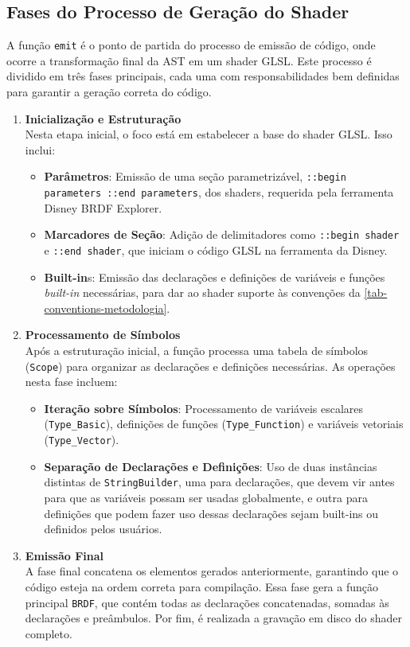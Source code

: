\subsection{Fases do Processo de Geração do Shader}
\label{sub-start-emitting}

A função \verb"emit" é o ponto de partida do processo de emissão de código, onde ocorre a transformação final da AST em um shader GLSL. Este processo é dividido em três fases principais, cada uma com responsabilidades bem definidas para garantir a geração correta do código.

\begin{enumerate}
    \item \textbf{Inicialização e Estruturação} \\
    Nesta etapa inicial, o foco está em estabelecer a base do shader GLSL. Isso inclui:
    \begin{itemize}
        \item \textbf{Parâmetros}: Emissão de uma seção parametrizável, \verb"::begin parameters ::end parameters", dos shaders, requerida pela ferramenta Disney BRDF Explorer.
        \item \textbf{Marcadores de Seção}: Adição de delimitadores como \verb|::begin shader| e \verb|::end shader|, que iniciam o código GLSL na ferramenta da Disney.
        \item \textbf{Built-in}s: Emissão das declarações e definições de variáveis e funções \textit{built-in} necessárias, para dar ao shader suporte às convenções da \autoref{tab-conventions-metodologia}.
    \end{itemize}

    \item \textbf{Processamento de Símbolos} \\
    Após a estruturação inicial, a função processa uma tabela de símbolos (\verb|Scope|) para organizar as declarações e definições necessárias. As operações nesta fase incluem:
    \begin{itemize}
        \item \textbf{Iteração sobre Símbolos}: Processamento de variáveis escalares (\verb|Type_Basic|), definições de funções (\verb|Type_Function|) e variáveis vetoriais (\verb|Type_Vector|).
        \item \textbf{Separação de Declarações e Definições}: Uso de duas instâncias distintas de \texttt{StringBuilder}, uma para declarações, que devem vir antes para que as variáveis possam ser usadas globalmente, e outra para definições que podem fazer uso dessas declarações sejam built-ins ou definidos pelos usuários.
    \end{itemize}

    \item \textbf{Emissão Final} \\
    A fase final concatena os elementos gerados anteriormente, garantindo que o código esteja na ordem correta para compilação. Essa fase gera a função principal \verb|BRDF|, que contém todas as declarações concatenadas, somadas às declarações e preâmbulos. Por fim, é realizada a gravação em disco do shader completo.
\end{enumerate}


